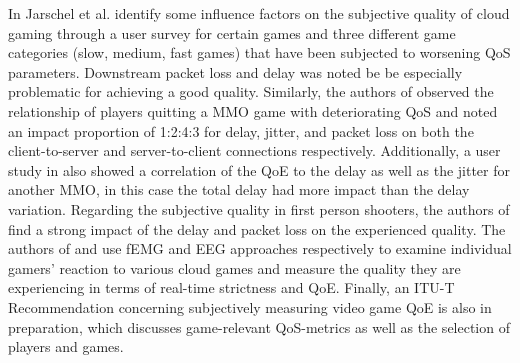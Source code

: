 In \cite{5976180} Jarschel et al. identify some influence factors on the subjective quality of cloud gaming through a user survey for certain games and three different game categories (slow, medium, fast games) that have been subjected to worsening \gls{QoS} parameters. Downstream packet loss and delay was noted be be especially problematic for achieving a good quality. Similarly, the authors of \cite{4591393} observed the relationship of players quitting a \gls{MMO} game with deteriorating \gls{QoS} and noted an impact proportion of 1:2:4:3 for delay, jitter, and packet loss on both the client-to-server and server-to-client connections respectively. Additionally, a user study in \cite{4604397} also showed a correlation of the \gls{QoE} to the delay as well as the jitter for another \gls{MMO}, in this case the total delay had more impact than the delay variation. Regarding the subjective quality in first person shooters, the authors of \cite{6614351} find a strong impact of the delay and packet loss on the experienced quality. The authors of \cite{6404025} and \cite{beyerusing} use \gls{fEMG} and \gls{EEG} approaches respectively to examine individual gamers' reaction to various cloud games and measure the quality they are experiencing in terms of real-time strictness and \gls{QoE}. Finally, an ITU-T Recommendation \cite{mollertowards} concerning subjectively measuring video game \gls{QoE} is also in preparation, which discusses game-relevant \gls{QoS}-metrics as well as the selection of players and games.

